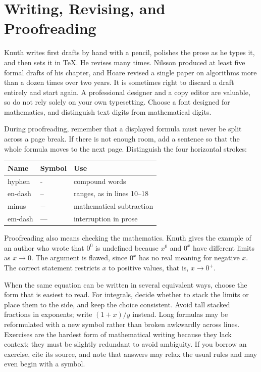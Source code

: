 \documentclass[11pt]{article}
\begin{document}
\section{Writing, Revising, and Proofreading}

Knuth writes first drafts by hand with a pencil, polishes the prose as he types it, and then sets it in \TeX. He revises many times. Nilsson produced at least five formal drafts of his chapter, and Hoare revised a single paper on algorithms more than a dozen times over two years. It is sometimes right to discard a draft entirely and start again. A professional designer and a copy editor are valuable, so do not rely solely on your own typesetting. Choose a font designed for mathematics, and distinguish text digits from mathematical digits.

During proofreading, remember that a displayed formula must never be split across a page break. If there is not enough room, add a sentence so that the whole formula moves to the next page. Distinguish the four horizontal strokes:

\begin{center}
\begin{tabular}{lll}
\toprule
Name & Symbol & Use \\
\midrule
hyphen & - & compound words \\
en-dash & -- & ranges, as in lines 10--18 \\
minus & $-$ & mathematical subtraction \\
em-dash & --- & interruption in prose \\
\bottomrule
\end{tabular}
\end{center}

Proofreading also means checking the mathematics. Knuth gives the example of an author who wrote that $0^0$ is undefined because $x^0$ and $0^x$ have different limits as $x \to 0$. The argument is flawed, since $0^x$ has no real meaning for negative $x$. The correct statement restricts $x$ to positive values, that is, $x \to 0^+$.

When the same equation can be written in several equivalent ways, choose the form that is easiest to read. For integrals, decide whether to stack the limits or place them to the side, and keep the choice consistent. Avoid tall stacked fractions in exponents; write $(1+x)/y$ instead. Long formulas may be reformulated with a new symbol rather than broken awkwardly across lines. Exercises are the hardest form of mathematical writing because they lack context; they must be slightly redundant to avoid ambiguity. If you borrow an exercise, cite its source, and note that answers may relax the usual rules and may even begin with a symbol.
\end{document}
